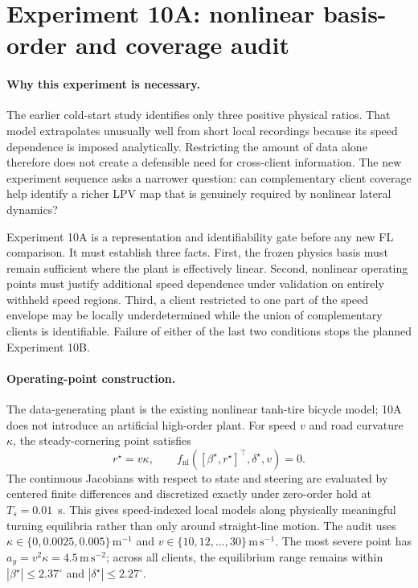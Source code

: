 \section{Experiment 10A: nonlinear basis-order and coverage audit}
\label{sec:experiment10a}

\paragraph{Why this experiment is necessary.}
The earlier cold-start study identifies only three positive physical ratios.
That model extrapolates unusually well from short local recordings because its
speed dependence is imposed analytically. Restricting the amount of data alone
therefore does not create a defensible need for cross-client information. The
new experiment sequence asks a narrower question: can complementary client
coverage help identify a richer LPV map that is genuinely required by nonlinear
lateral dynamics?

Experiment 10A is a representation and identifiability gate before any new FL
comparison. It must establish three facts. First, the frozen physics basis must
remain sufficient where the plant is effectively linear. Second, nonlinear
operating points must justify additional speed dependence under validation on
entirely withheld speed regions. Third, a client restricted to one part of the
speed envelope may be locally underdetermined while the union of complementary
clients is identifiable. Failure of either of the last two conditions stops the
planned Experiment 10B.

\paragraph{Operating-point construction.}
The data-generating plant is the existing nonlinear tanh-tire bicycle model;
10A does not introduce an artificial high-order plant. For speed $v$ and road
curvature $\kappa$, the steady-cornering point satisfies
\begin{equation}
 r^\star=v\kappa,\qquad
 f_{\mathrm{nl}}\!\left([\beta^\star,r^\star]^\top,
 \delta^\star,v\right)=0.
\end{equation}
The continuous Jacobians with respect to state and steering are evaluated by
centered finite differences and discretized exactly under zero-order hold at
$T_s=0.01$~s. This gives speed-indexed local models along physically meaningful
turning equilibria rather than only around straight-line motion. The audit uses
$\kappa\in\{0,0.0025,0.005\}\,\mathrm{m}^{-1}$ and
$v\in\{10,12,\ldots,30\}\,\mathrm{m\,s}^{-1}$. The most severe point has
$a_y=v^2\kappa=4.5\,\mathrm{m\,s}^{-2}$; across all clients, the equilibrium
range remains within $|\beta^\star|\leq2.37^\circ$ and
$|\delta^\star|\leq2.27^\circ$.

